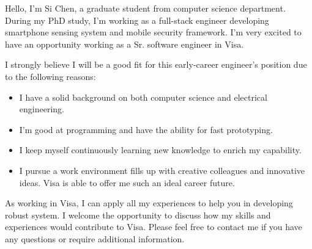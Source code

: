 \documentclass[11pt, a4paper]{awesome-cv}
\begin{document}
\makecvheaderBeepi

\makelettertitle

\begin{cvletter}
Hello, I'm Si Chen, a graduate student from computer science department. During my PhD study, I'm working as a full-stack engineer developing smartphone sensing system and mobile security framework. I'm very excited to have an opportunity working as a Sr. software engineer in Visa.


I strongly believe I will be a good fit for this early-career engineer’s position due to the following reasons:
\begin{itemize}
\item I have a solid background on both computer science and electrical engineering.
\item I'm good at programming and have the ability for fast prototyping. 
\item I keep myself continuously learning new knowledge to enrich my capability.
\item I pursue a work environment fills up with creative colleagues and innovative ideas. Visa is able to offer me such an ideal career future. 
\end{itemize}
As working in Visa, I can apply all my experiences to help you in developing robust system. I welcome the opportunity to discuss how my skills and experiences would contribute to Visa. Please feel free to contact me if you have any questions or require additional information.

\end{cvletter}

\makeletterclosing
\end{document}
